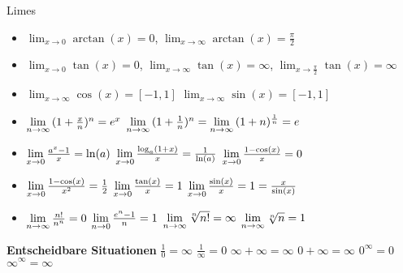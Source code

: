 \begin{Rechenregeln}{Limes}{}
    \begin{itemize}
    \item $\lim_{x\to 0} \arctan(x) = 0$, $\lim_{x\to\infty} \arctan(x) = \frac{\pi}{2}$
    \item $\lim_{x\to 0} \tan(x) = 0$, $\lim_{x\to\infty} \tan(x) = \infty$, $\lim_{x\to\frac{\pi}{2}} \tan(x) = \infty$
    \item $\lim_{x\to\infty} \cos(x) = [-1, 1]$ \abstand $\lim_{x\to\infty} \sin(x) = [-1, 1]$
    \item $\lim\limits_{n \rightarrow \infty}{(1+\frac{x}{n})^{n}} = e^{x}$ \abstand $\lim\limits_{n \rightarrow \infty}{(1+\frac{1}{n})^{n}} = \lim\limits_{n \rightarrow \infty}{(1+n)^{\frac{1}{n}}} = e$ 
    \item $\lim\limits_{x \rightarrow 0}{\frac{a^{x}-1}{x}} = \ln(a)$ \abstand \(\lim\limits_{x \rightarrow 0}\frac{\log_a(1+x)}{x} = \frac{1}{\ln(a)}\) \abstand \(\lim\limits_{x \rightarrow 0}{\frac{1-\cos(x)}{x}} = 0\) 
    \item \( \lim\limits_{x \rightarrow 0}{\frac{1-\cos(x)}{x^{2}}} = \frac{1}{2} \) \abstand \( \lim\limits_{x \rightarrow 0}{\frac{\tan(x)}{x}} = 1\) \abstand \( \lim\limits_{x \rightarrow 0}{\frac{\sin(x)}{x}} = 1 = \frac{x}{\sin(x)}\) 
    \item \(\lim\limits_{n \rightarrow \infty}{\frac{n!}{n^{n}}} = 0\) \abstand \(\lim\limits_{n \rightarrow 0}{\frac{e^{n} -1}{n}} = 1\) \abstand \(\lim\limits_{n \rightarrow \infty}{\sqrt[n]{n!}} = \infty\) \abstand \(\lim\limits_{n \rightarrow \infty} {\sqrt[n]{n}} = 1\)
    \end{itemize}
    \textbf{Entscheidbare Situationen}
    $\frac{1}{0} = \infty$ \abstand $\frac{1}{\infty} = 0$ \abstand $\infty + \infty = \infty$ 
    \abstand $0 + \infty = \infty$ \abstand $0^{\infty} = 0$ \abstand $\infty^{\infty} = \infty$
\end{Rechenregeln}

